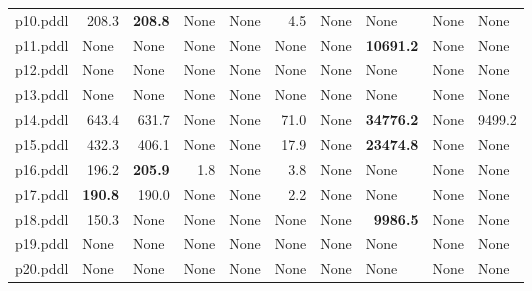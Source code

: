 \documentclass{article}
\begin{document}
\begin{tabular}{@{}lrrrrrrrrr@{}}
p10.pddl & 208.3 & \textbf{208.8} & \multicolumn{1}{|l|}{None} & \multicolumn{1}{|l|}{None} & 4.5 & \multicolumn{1}{|l|}{None} & \multicolumn{1}{|l|}{None} & \multicolumn{1}{|l|}{None} & \multicolumn{1}{|l|}{None} \\
p11.pddl & \multicolumn{1}{|l|}{None} & \multicolumn{1}{|l|}{None} & \multicolumn{1}{|l|}{None} & \multicolumn{1}{|l|}{None} & \multicolumn{1}{|l|}{None} & \multicolumn{1}{|l|}{None} & \textbf{10691.2} & \multicolumn{1}{|l|}{None} & \multicolumn{1}{|l|}{None} \\
p12.pddl & \multicolumn{1}{|l|}{None} & \multicolumn{1}{|l|}{None} & \multicolumn{1}{|l|}{None} & \multicolumn{1}{|l|}{None} & \multicolumn{1}{|l|}{None} & \multicolumn{1}{|l|}{None} & \multicolumn{1}{|l|}{None} & \multicolumn{1}{|l|}{None} & \multicolumn{1}{|l|}{None} \\
p13.pddl & \multicolumn{1}{|l|}{None} & \multicolumn{1}{|l|}{None} & \multicolumn{1}{|l|}{None} & \multicolumn{1}{|l|}{None} & \multicolumn{1}{|l|}{None} & \multicolumn{1}{|l|}{None} & \multicolumn{1}{|l|}{None} & \multicolumn{1}{|l|}{None} & \multicolumn{1}{|l|}{None} \\
p14.pddl & 643.4 & 631.7 & \multicolumn{1}{|l|}{None} & \multicolumn{1}{|l|}{None} & 71.0 & \multicolumn{1}{|l|}{None} & \textbf{34776.2} & \multicolumn{1}{|l|}{None} & 9499.2 \\
p15.pddl & 432.3 & 406.1 & \multicolumn{1}{|l|}{None} & \multicolumn{1}{|l|}{None} & 17.9 & \multicolumn{1}{|l|}{None} & \textbf{23474.8} & \multicolumn{1}{|l|}{None} & \multicolumn{1}{|l|}{None} \\
p16.pddl & 196.2 & \textbf{205.9} & 1.8 & \multicolumn{1}{|l|}{None} & 3.8 & \multicolumn{1}{|l|}{None} & \multicolumn{1}{|l|}{None} & \multicolumn{1}{|l|}{None} & \multicolumn{1}{|l|}{None} \\
p17.pddl & \textbf{190.8} & 190.0 & \multicolumn{1}{|l|}{None} & \multicolumn{1}{|l|}{None} & 2.2 & \multicolumn{1}{|l|}{None} & \multicolumn{1}{|l|}{None} & \multicolumn{1}{|l|}{None} & \multicolumn{1}{|l|}{None} \\
p18.pddl & 150.3 & \multicolumn{1}{|l|}{None} & \multicolumn{1}{|l|}{None} & \multicolumn{1}{|l|}{None} & \multicolumn{1}{|l|}{None} & \multicolumn{1}{|l|}{None} & \textbf{9986.5} & \multicolumn{1}{|l|}{None} & \multicolumn{1}{|l|}{None} \\
p19.pddl & \multicolumn{1}{|l|}{None} & \multicolumn{1}{|l|}{None} & \multicolumn{1}{|l|}{None} & \multicolumn{1}{|l|}{None} & \multicolumn{1}{|l|}{None} & \multicolumn{1}{|l|}{None} & \multicolumn{1}{|l|}{None} & \multicolumn{1}{|l|}{None} & \multicolumn{1}{|l|}{None} \\
p20.pddl & \multicolumn{1}{|l|}{None} & \multicolumn{1}{|l|}{None} & \multicolumn{1}{|l|}{None} & \multicolumn{1}{|l|}{None} & \multicolumn{1}{|l|}{None} & \multicolumn{1}{|l|}{None} & \multicolumn{1}{|l|}{None} & \multicolumn{1}{|l|}{None} & \multicolumn{1}{|l|}{None} \\
\end{tabular}
\end{document}
